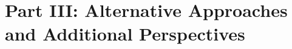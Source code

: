 

\newpage
\part*{Part III: Alternative Approaches and Additional Perspectives}

\renewcommand{\thesection}{R.\arabic{section}}






